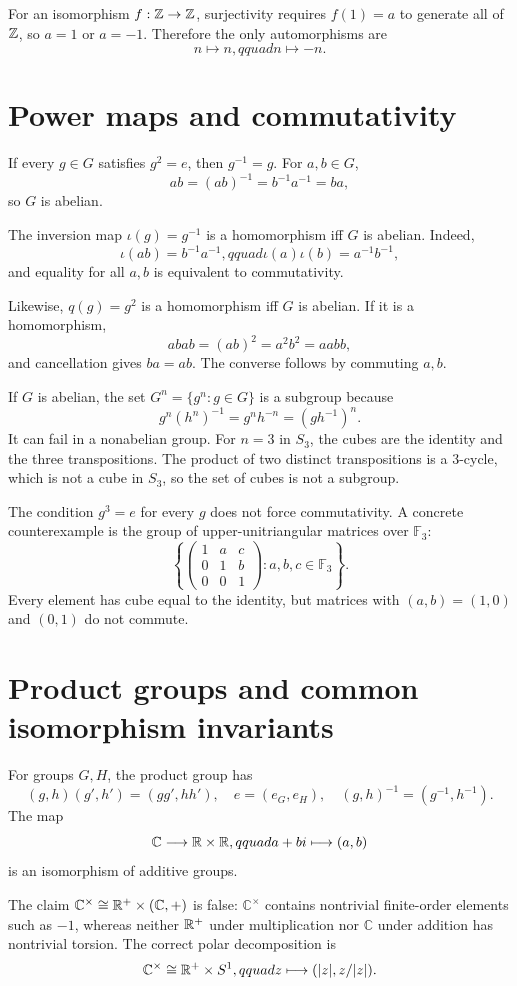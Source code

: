 \documentclass[11pt,openany]{book}
\newcommand{\C}{\mathbb C}\newcommand{\PP}{\mathcal P}
\theoremstyle{definition}
\begin{document}
For an isomorphism $f:\mathbb Z\to\mathbb Z$, surjectivity requires $f(1)=a$ to generate all of $\mathbb Z$, so $a=1$ or $a=-1$. Therefore the only automorphisms are
\[
n\mapsto n,qquad n\mapsto-n.
\]

\section{Power maps and commutativity}
If every $g\in G$ satisfies $g^2=e$, then $g^{-1}=g$. For $a,b\in G$,
\[
ab=(ab)^{-1}=b^{-1}a^{-1}=ba,
\]
so $G$ is abelian.

The inversion map $\iota(g)=g^{-1}$ is a homomorphism iff $G$ is abelian. Indeed,
\[
\iota(ab)=b^{-1}a^{-1},qquad \iota(a)\iota(b)=a^{-1}b^{-1},
\]
and equality for all $a,b$ is equivalent to commutativity.

Likewise, $q(g)=g^2$ is a homomorphism iff $G$ is abelian. If it is a homomorphism,
\[
abab=(ab)^2=a^2b^2=aabb,
\]
and cancellation gives $ba=ab$. The converse follows by commuting $a,b$.

If $G$ is abelian, the set $G^n=\{g^n:g\in G\}$ is a subgroup because
\[
g^n(h^n)^{-1}=g^nh^{-n}=(gh^{-1})^n.
\]
It can fail in a nonabelian group. For $n=3$ in $S_3$, the cubes are the identity and the three transpositions. The product of two distinct transpositions is a $3$-cycle, which is not a cube in $S_3$, so the set of cubes is not a subgroup.

The condition $g^3=e$ for every $g$ does not force commutativity. A concrete counterexample is the group of upper-unitriangular matrices over $\mathbb F_3$:
\[
\left\{
\begin{pmatrix}1&a&c\\0&1&b\\0&0&1\end{pmatrix}:a,b,c\in\mathbb F_3
\right\}.
\]
Every element has cube equal to the identity, but matrices with $(a,b)=(1,0)$ and $(0,1)$ do not commute.

\section{Product groups and common isomorphism invariants}
For groups $G,H$, the product group has
\[
(g,h)(g',h')=(gg',hh'),\quad e=(e_G,e_H),\quad(g,h)^{-1}=(g^{-1},h^{-1}).
\]
The map
\[
\C\longrightarrow\R\times\R,qquad a+bi\longmapsto(a,b)
\]
is an isomorphism of additive groups.

The claim $\C^\times\cong\R^+\times(\C,+)$ is false: $\C^\times$ contains nontrivial finite-order elements such as $-1$, whereas neither $\mathbb R^+$ under multiplication nor $\C$ under addition has nontrivial torsion. The correct polar decomposition is
\[
\C^\times\cong\R^+\times S^1,qquad z\longmapsto(|z|,z/|z|).
\]
\end{document}
